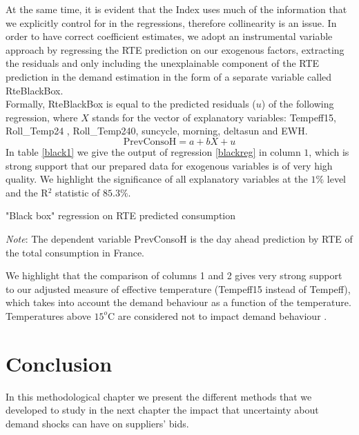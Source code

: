 At the same time, it is evident that the Index uses much of the information that we explicitly control for in the regressions, therefore collinearity is an issue. In order to have correct coefficient estimates, we adopt an instrumental variable approach by regressing the RTE prediction on our exogenous factors, extracting the residuals and only including the unexplainable component of the RTE prediction in the demand estimation in the form of a separate variable called RteBlackBox.\\

Formally, RteBlackBox is equal to the predicted residuals ($u$) of the following regression, where $X$ stands for the vector of explanatory variables: Tempeff15,  Roll\_Temp24 ,  Roll\_Temp240, suncycle, morning, deltasun and EWH.  \\
\begin{equation}
\label{blackreg}
 \text{PrevConsoH} = a + bX +u 
\end{equation}
In table \ref{black1} we give the output of regression \ref{blackreg} in column $1$, which is strong support that our prepared data for exogenous variables is of very high quality. We highlight the significance of all explanatory variables at the $1\%$ level and the R$^2$ statistic of $85.3\%$. \\

\begin{table}[!ht]

\caption{\label{black1} "Black box" regression on RTE predicted consumption}
\emph{Note}: The dependent variable PrevConsoH is the day ahead prediction by RTE of the total consumption in France. 
\end{table}

We highlight that the comparison of columns 1 and 2 gives very strong support to our adjusted measure of effective temperature (Tempeff15 instead of Tempeff), which takes into account the demand behaviour as a function of the temperature. Temperatures above $15^o$C are considered not to impact demand behaviour \cite{rtewebsite1}.

\section{Conclusion}

In this methodological chapter we present the different methods that we developed to study in the next chapter the impact that uncertainty about demand shocks can have on suppliers' bids. \\

